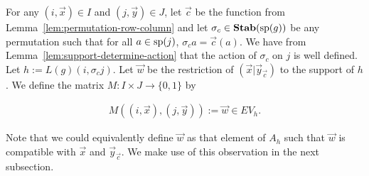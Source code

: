 \documentclass[../paper.tex]{subfiles}
\begin{document}

For any $(i, \vec{x}) \in I$ and $(j, \vec{y}) \in J$, let $\vec{c}$ be the
function from Lemma~\ref{lem:permutation-row-column} and let $\sigma_{c} \in
\text{\textbf{Stab}} (\text{sp} (g))$ be any permutation such that for all $a \in \text{sp}(j)$, $\sigma_{c}
a = \vec{c}(a)$. We have from Lemma~\ref{lem:support-determine-action} that the
action of $\sigma_{c}$ on $j$ is well defined. Let $h := L(g)(i, \sigma_c j)$.
Let $\vec{w}$ be the restriction of $(\vec{x} \vert \vec{y}_{\vec{c}})$ to the
support of $h$. We define the matrix $M : I \times J \rightarrow \{0,1\}$ by

\begin{align*}
	M((i , \vec{x}), (j, \vec{y})) := \vec{w} \in EV_h. 
\end{align*}

Note that we could equivalently define $\vec{w}$ as that element of $A_h$ such
that $\vec{w}$ is compatible with $\vec{x}$ and $\vec{y}_{\vec{c}}$. We make use
of this observation in the next subsection.

\end{document}
